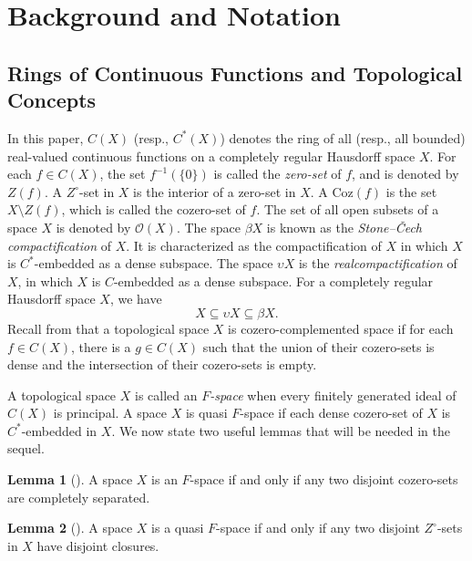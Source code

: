 \documentclass{amsart}
\theoremstyle{definition}
\theoremstyle{remark}
\numberwithin{equation}{section}
\newcommand{\CO}{\mathcal{O}}
\theoremstyle{definition}\newtheorem{thm}{Theorem}[section]
\theoremstyle{definition}\newtheorem{cor}[thm]{Corollary}
\theoremstyle{definition}\newtheorem{lem}[thm]{Lemma}
\theoremstyle{definition}\newtheorem{prop}[thm]{Proposition}
\theoremstyle{definition}\newtheorem{defn}[thm]{Definition}
\theoremstyle{definition}\newtheorem{Rem}[thm]{Remark}
\theoremstyle{remark}\newtheorem{rem}[thm]{Remark}
\theoremstyle{definition}\newtheorem{exam}[thm]{Example}
\theoremstyle{definition}\newtheorem{qu}[thm]{question}
\begin{document}
\section{Background and Notation}
\subsection{Rings of Continuous Functions and Topological Concepts}

In this paper, $C(X)$ (resp., $C^{*}(X)$) denotes the ring of all (resp., all bounded) real-valued continuous functions on a completely regular Hausdorff space $X$. For each $f \in C(X)$, the set $f^{-1}(\{0\})$ is called the \emph{zero-set} of $f$, and is denoted by $Z(f)$.  A $Z^{\circ}$-set in $X$ is the interior of a zero-set in $X$. A Coz$(f)$ is the set $X\setminus Z(f)$, which is called the cozero-set of $f$. The set of all open subsets of a space $X$ is denoted by $\CO(X)$. 
The space $\beta X$ is known as the \emph{Stone--\v{C}ech compactification} of $X$. It is characterized as the compactification of $X$ in which $X$ is $C^{*}$-embedded as a dense subspace. The space $\upsilon X$ is the \emph{realcompactification} of $X$, in which $X$ is $C$-embedded as a dense subspace. For a completely regular Hausdorff space $X$, we have 
\[
X \subseteq \upsilon X \subseteq \beta X.
\]
Recall from \cite{HW} that a topological space $X$ is cozero-complemented space if for each $f\in C(X)$, there is a $g\in C(X)$ such that the union of their cozero-sets is dense and the intersection of their cozero-sets is empty. 

A topological space $X$ is  called an \emph{$F$-space} when every finitely generated ideal of $C(X)$ is principal.  A  space $X$ is quasi $F$-space if each dense cozero-set of $X$ is $C^{*}$-embedded in $X$.  
We now state two useful lemmas that will be needed in the sequel.
\begin{lem}[{\cite[14.N]{GJ}}]\label{p1}
A space $X$ is an $F$-space if and only if any two disjoint cozero-sets are completely separated.
\end{lem}
\begin{lem}[{\cite[Lemma 2.10]{HVW}}]\label{p2}
A space $X$ is a quasi $F$-space if and only if any two disjoint $Z^{\circ}$-sets in $X$ have disjoint closures.
\end{lem}
\end{document}
